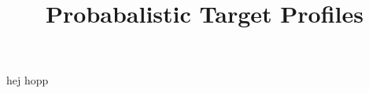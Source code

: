 \documentclass{article}
\begin{document}
\title*{Probabalistic Target Profiles}

hej hopp
\end{document}

